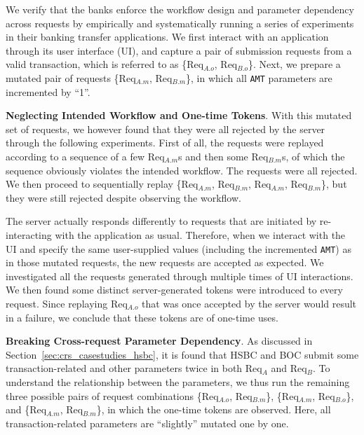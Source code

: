 \documentclass[letter]{sig-alternate-2013}
\begin{document}
We verify that the banks enforce the workflow design and parameter dependency across requests by empirically and systematically running a series of experiments in their banking transfer applications. We first interact with an application through its user interface (UI), and capture a pair of submission requests from a valid transaction, which is referred to as \{Req$_{A.o}$, Req$_{B.o}$\}. Next, we prepare a mutated pair of requests \{Req$_{A.m}$, Req$_{B.m}$\}, in which all \verb"AMT" parameters are incremented by ``1''.

\textbf{Neglecting Intended Workflow and One-time Tokens}. With this mutated set of requests, we however found that they were all rejected by the server through the following experiments. First of all, the requests were replayed according to a sequence of a few Req$_{A.m}$s and then some Req$_{B.m}$s, of which the sequence obviously violates the intended workflow. The requests were all rejected. We then proceed to sequentially replay \{Req$_{A.m}$, Req$_{B.m}$, Req$_{A.m}$, Req$_{B.m}$\}, but they were still rejected despite observing the workflow. 

The server actually responds differently to requests that are initiated by re-interacting with the application as usual. Therefore, when we interact with the UI and specify the same user-supplied values (including the incremented \verb"AMT") as in those mutated requests, the new requests are accepted as expected. We investigated all the requests generated through multiple times of UI interactions. We then found some distinct server-generated tokens were introduced to every request. Since replaying Req$_{A.o}$ that was once accepted by the server would result in a failure, we conclude that these tokens are of one-time uses.

\textbf{Breaking Cross-request Parameter Dependency}. As discussed in Section~\ref{sec:crs_casestudies_hsbc}, it is found that HSBC and BOC submit some transaction-related and other parameters twice in both Req$_A$ and Req$_B$. To understand the relationship between the parameters, we thus run the remaining three possible pairs of request combinations \{Req$_{A.o}$, Req$_{B.m}$\}, \{Req$_{A.m}$, Req$_{B.o}$\}, and \{Req$_{A.m}$, Req$_{B.m}$\}, in which the one-time tokens are observed. Here, all transaction-related parameters are ``slightly'' mutated one by one.
\end{document}
